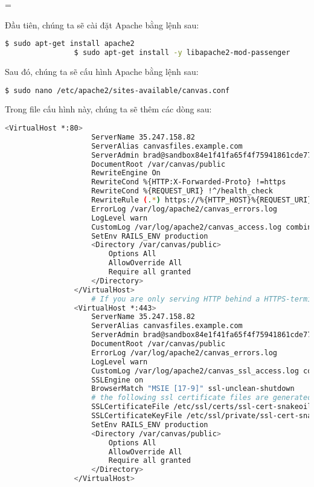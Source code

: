 =\documentclass[../Thesis.tex]{subfiles}
\begin{document}
\begin{enumerate}
            Đầu tiên, chúng ta sẽ cài đặt Apache bằng lệnh sau:
            \begin{lstlisting}[language=bash]
                $ sudo apt-get install apache2
                $ sudo apt-get install -y libapache2-mod-passenger
            \end{lstlisting}

            Sau đó, chúng ta sẽ cấu hình Apache bằng lệnh sau:
            \begin{lstlisting}[language=bash]
                $ sudo nano /etc/apache2/sites-available/canvas.conf
            \end{lstlisting}

            Trong file cấu hình này, chúng ta sẽ thêm các dòng sau:
            \begin{lstlisting}[language=bash]
                <VirtualHost *:80>
                    ServerName 35.247.158.82
                    ServerAlias canvasfiles.example.com
                    ServerAdmin brad@sandbox84e1f41fa65f4f75941861cde77b288a.mailgun.org
                    DocumentRoot /var/canvas/public
                    RewriteEngine On
                    RewriteCond %{HTTP:X-Forwarded-Proto} !=https
                    RewriteCond %{REQUEST_URI} !^/health_check
                    RewriteRule (.*) https://%{HTTP_HOST}%{REQUEST_URI} [L]
                    ErrorLog /var/log/apache2/canvas_errors.log
                    LogLevel warn
                    CustomLog /var/log/apache2/canvas_access.log combined
                    SetEnv RAILS_ENV production
                    <Directory /var/canvas/public>
                        Options All
                        AllowOverride All
                        Require all granted
                    </Directory>
                </VirtualHost>
                    # If you are only serving HTTP behind a HTTPS-terminating load balancer, skip the next VirtualHost
                <VirtualHost *:443>
                    ServerName 35.247.158.82
                    ServerAlias canvasfiles.example.com
                    ServerAdmin brad@sandbox84e1f41fa65f4f75941861cde77b288a.mailgun.org
                    DocumentRoot /var/canvas/public
                    ErrorLog /var/log/apache2/canvas_errors.log
                    LogLevel warn
                    CustomLog /var/log/apache2/canvas_ssl_access.log combined
                    SSLEngine on
                    BrowserMatch "MSIE [17-9]" ssl-unclean-shutdown
                    # the following ssl certificate files are generated for you from the ssl-cert package.
                    SSLCertificateFile /etc/ssl/certs/ssl-cert-snakeoil.pem
                    SSLCertificateKeyFile /etc/ssl/private/ssl-cert-snakeoil.key
                    SetEnv RAILS_ENV production
                    <Directory /var/canvas/public>
                        Options All
                        AllowOverride All
                        Require all granted
                    </Directory>
                </VirtualHost>
            \end{lstlisting}


\end{enumerate}
\end{document}
